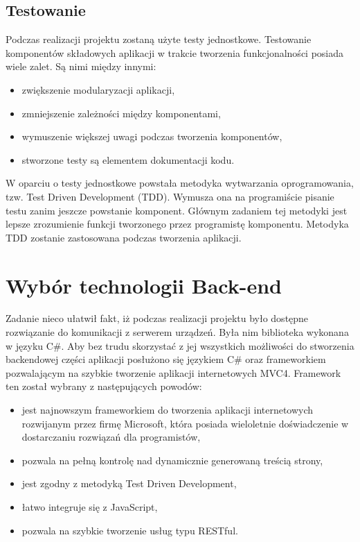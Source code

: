 \subsection{Testowanie}
Podczas realizacji projektu zostaną użyte testy jednostkowe. Testowanie komponentów składowych aplikacji w trakcie tworzenia funkcjonalności posiada wiele zalet. Są nimi między innymi\cite{tests-book}:
\begin{itemize}
\item zwiększenie modularyzacji aplikacji,
\item zmniejszenie zależności między komponentami,
\item wymuszenie większej uwagi podczas tworzenia komponentów,
\item stworzone testy są elementem dokumentacji kodu.
\end{itemize}

W oparciu o testy jednostkowe powstała metodyka wytwarzania oprogramowania, tzw. Test Driven Development (TDD)\cite{tests-book}. Wymusza ona na programiście pisanie testu zanim jeszcze powstanie komponent. Głównym zadaniem tej metodyki jest lepsze zrozumienie funkcji tworzonego przez programistę komponentu. 
Metodyka TDD zostanie zastosowana podczas tworzenia aplikacji.

\section{Wybór technologii Back-end}

Zadanie nieco ułatwił fakt, iż podczas realizacji projektu było dostępne rozwiązanie do komunikacji z serwerem urządzeń. Była nim biblioteka wykonana w języku C\#. Aby bez trudu skorzystać z jej wszystkich możliwości do stworzenia backendowej części aplikacji posłużono się językiem C\# oraz frameworkiem pozwalającym na szybkie tworzenie aplikacji internetowych MVC4. Framework ten został wybrany z następujących powodów\cite{mvc-book}:

\begin{itemize}
\item jest najnowszym frameworkiem do tworzenia aplikacji internetowych rozwijanym przez firmę Microsoft, która posiada wieloletnie doświadczenie w dostarczaniu rozwiązań dla programistów,
\item pozwala na pełną kontrolę nad dynamicznie generowaną treścią strony,
\item jest zgodny z metodyką Test Driven Development,
\item łatwo integruje się z JavaScript,
\item pozwala na szybkie tworzenie usług typu RESTful.
\end{itemize}



